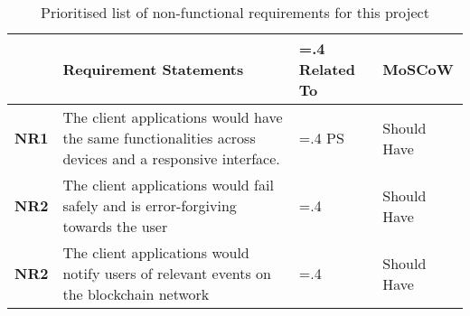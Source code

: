 \begin{table}[!h] 
    \caption{Prioritised list of non-functional requirements for this project}
    \centering
    \label{table:nonfx-reqs}
    \begin{tabularx}{\textwidth}{>{\bfseries}l>{\hsize=1.6\hsize}X>{\hsize=.4\hsize}Xl}
        & Requirement Statements & Related To & MoSCoW\\
        \toprule
        NR1 & The client applications would have the same functionalities across devices and 
        a responsive interface. & PS & Should Have\\\midrule
        NR2 & The client applications would fail safely and is error-forgiving 
        towards the user &  & Should Have\\\midrule
        NR2 & The client applications would notify users of relevant events on the blockchain
        network &  & Should Have\\\midrule
        \bottomrule
    \end{tabularx}
\end{table}